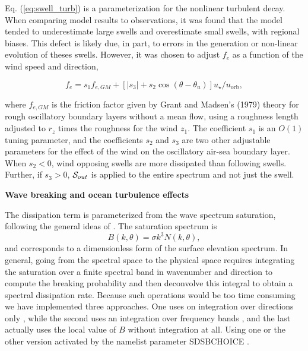 Eq. (\ref{eq:swell_turb}) is a parameterization for the
nonlinear turbulent decay. When comparing model results to observations, it
was found that the model tended to underestimate large swells and overestimate
small swells, with regional biases. This defect is likely due, in part, to
errors in the generation or non-linear evolution of theses swells. However, it
was chosen to adjust $f_e$ as a function of the wind speed and direction,

\begin{equation}
f_e = s_1 f_{e,GM} + \left[\left|s_3\right| + s_2 \cos
(\theta-\theta_u)\right]u_\star / u_{\mathrm{orb}},\label{fevar}
\end{equation}

\noindent 
where $f_{e,GM}$ is the friction factor given by Grant and Madsen's
(1979)\nocite{art:GM79} theory for rough oscillatory boundary layers without a
mean flow, using a roughness length adjusted to $r_z$ times the roughness for
the wind $z_1$. The coefficient $s_1$ is an $O(1)$ tuning parameter, and the
coefficients $s_2$ and $s_3$ are two other adjustable parameters for the
effect of the wind on the oscillatory air-sea boundary layer. When $s_2 < 0$,
wind opposing swells are more dissipated than following swells. Further, if
$s_3 > 0$, ${\cal S}_{out}$ is applied to the entire spectrum and not just the
swell.


\vsssub
\textbf{Wave breaking and ocean turbulence effects} 
\vsssub


The dissipation term is parameterized from the wave spectrum saturation, following the general ideas of \cite{art:Phi85}.
The saturation spectrum is 
\begin{equation}
B\left(k,\theta\right)= \sigma k^3  N(k,\theta) \label{defB},
\end{equation}
and corresponds to a dimensionless form of the surface elevation spectrum. In general, going from the spectral space to the physical space requires 
integrating the saturation over a finite spectral band in wavenumber and direction to compute the breaking probability 
and then deconvolve this integral to obtain a spectral dissipation rate. Because such operations would be too time consuming we have 
implemented three approaches. One uses on integration over directions only \citep{art:Aea10}, while the second uses an integration  over frequency 
bands \citep{Filipot&Ardhuin2012}, and the last actually uses the local value of $B$ without integration at all. Using one or the other version activated by the namelist parameter {\F  SDSBCHOICE  }.

